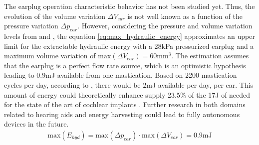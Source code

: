 \documentclass[3p,twocolumn,preprint]{elsarticle}
\begin{document}
The earplug operation characteristic behavior has not been studied yet. Thus, the evolution of the volume variation $\Delta V_{ear}$ is not well known as a function of the pressure variation $\Delta p_{ear}$. However, considering the pressure and volume variation levels from \cite{Delnavaz2012} and \cite{Bouchard-Roy2020}, the equation \ref{eq:max_hydraulic_energy} approximates an upper limit for the extractable hydraulic energy with a 28kPa pressurized earplug and a maximum volume variation of $\text{max}(\Delta V_{ear})=60$mm$^3$. The estimation assumes that the earplug is a perfect flow rate source, which is an optimistic hypothesis leading to $0.9$mJ available from one mastication. Based on 2200 mastication cycles per day, according to \cite{Goll2011}, there would be $2$mJ available per day, per ear. This amount of energy could theoretically enhance supply 23.5\% of the 17J of needed for the state of the art of cochlear implants \cite{Kulah2022}. Further research in both domains related to hearing aids and energy harvesting could lead to fully autonomous devices in the future.
\begin{align}
	\text{max}(E_{hyd}) = \text{max}(\Delta p_{ear}) \cdot \text{max}(\Delta V_{ear}) = 0.9\text{mJ}
	\label{eq:max_hydraulic_energy}
\end{align}

\end{document}
